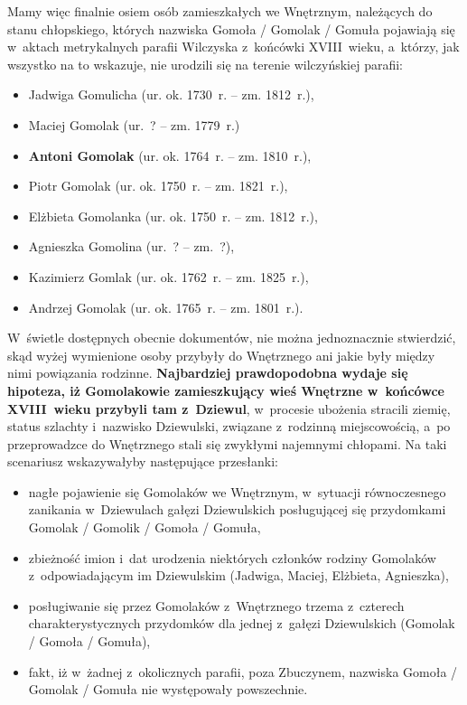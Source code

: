 Mamy więc finalnie osiem osób zamieszkałych we Wnętrznym, należących do stanu 
chłopskiego, których nazwiska Gomoła / Gomolak / Gomuła pojawiają się 
w~aktach metrykalnych parafii Wilczyska z~końcówki XVIII~wieku, a~którzy, jak 
wszystko na to wskazuje, nie urodzili się na terenie wilczyńskiej parafii:

\begin{itemize}
    \item Jadwiga Gomulicha (ur. ok. 1730~r. -- zm. 1812~r.),
    \item Maciej Gomolak (ur.~? -- zm. 1779~r.)
    \item \textbf{Antoni Gomolak} (ur. ok. 1764~r. -- zm. 1810~r.),
    \item Piotr Gomolak (ur. ok. 1750~r. -- zm. 1821~r.),
    \item Elżbieta Gomolanka (ur. ok. 1750~r. -- zm. 1812~r.),
    \item Agnieszka Gomolina (ur.~? -- zm.~?),
    \item Kazimierz Gomlak (ur. ok. 1762~r. -- zm. 1825~r.),
    \item Andrzej Gomolak (ur. ok. 1765~r. -- zm. 1801~r.). 
  \end{itemize}

W~świetle dostępnych obecnie dokumentów, nie można jednoznacznie stwierdzić, 
skąd wyżej wymienione osoby przybyły do Wnętrznego ani jakie były między nimi 
powiązania rodzinne. \textbf{Najbardziej prawdopodobna wydaje się hipoteza, 
iż Gomolakowie zamieszkujący wieś Wnętrzne w~końcówce XVIII~wieku przybyli 
tam z~Dziewul}, w~procesie ubożenia stracili ziemię, status szlachty 
i~nazwisko Dziewulski, związane z~rodzinną miejscowością, a~po przeprowadzce 
do Wnętrznego stali się zwykłymi najemnymi chłopami. Na taki scenariusz 
wskazywałyby następujące przesłanki:

\begin{itemize}
    \item nagłe pojawienie się Gomolaków we Wnętrznym, w~sytuacji 
    równoczesnego zanikania w~Dziewulach gałęzi Dziewulskich posługującej się 
    przydomkami Gomolak / Gomolik / Gomoła / Gomuła,
    \item zbieżność imion i~dat urodzenia niektórych członków rodziny 
    Gomolaków z~odpowiadającym im Dziewulskim (Jadwiga, Maciej, Elżbieta, 
    Agnieszka),
    \item posługiwanie się przez Gomolaków z~Wnętrznego trzema z~czterech 
    charakterystycznych przydomków dla jednej z~gałęzi Dziewulskich 
    (Gomolak / Gomoła / Gomuła),
    \item fakt, iż w~żadnej z~okolicznych parafii, poza Zbuczynem, nazwiska 
    Gomoła / Gomolak / Gomuła nie występowały powszechnie.
\end{itemize}
 
